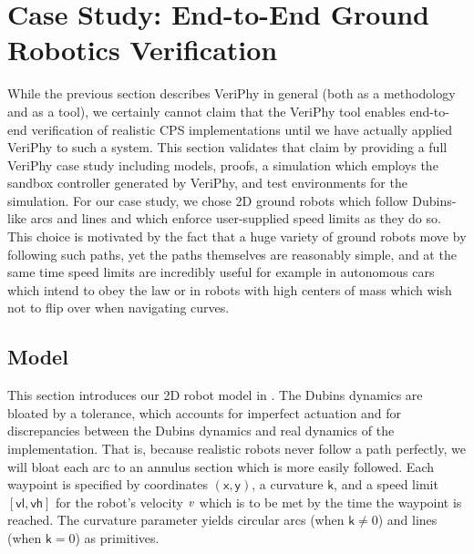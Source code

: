 \documentclass[12pt]{cmuthesis}
\theoremstyle{definition}
\theoremstyle{remark}
\newcommand{\xgvar}{\textsf{x}}
\newcommand{\ygvar}{\textsf{y}}
\newcommand{\kvar}{\textsf{k}}
\newcommand{\vlvar}{\textsf{vl}}
\newcommand{\vhvar}{\textsf{vh}}
\newcommand{\VeriPhy}{VeriPhy\xspace}
\begin{document}
\section{Case Study: End-to-End Ground Robotics Verification}
\label{sec:ground-robotics}

While the previous section describes \VeriPhy in general (both as a methodology and as a tool), we certainly cannot claim that the \VeriPhy tool enables end-to-end verification of realistic CPS implementations until we have actually applied \VeriPhy to such a system.
This section validates that claim by providing a full \VeriPhy case study including \dL models, proofs, a simulation which employs the sandbox controller generated by \VeriPhy, and test environments for the simulation.
For our case study, we chose 2D ground robots which follow Dubins-like arcs and lines and which enforce user-supplied speed limits as they do so.
This choice is motivated by the fact that a huge variety of ground robots move by following such paths, yet the paths themselves are reasonably simple, and at the same time speed limits are incredibly useful for example in autonomous cars which intend to obey the law or in robots with high centers of mass which wish not to flip over when navigating curves.

\subsection{Model}
\label{sec:planar-driving-system}
This section introduces our 2D robot model in \dL.
The Dubins dynamics are bloated by a tolerance, which accounts for imperfect actuation and for discrepancies between the Dubins dynamics and real dynamics of the implementation.
That is, because realistic robots never follow a path perfectly, we will bloat each arc to an annulus section which is more easily followed.
Each waypoint is specified by coordinates $(\xgvar,\ygvar)$, a curvature $\kvar$, and a speed limit $[\vlvar,\vhvar]$ for the robot's velocity ${\it v}$ which is to be met by the time the waypoint is reached.
The curvature parameter yields circular arcs (when $\kvar \not= 0$) and lines (when $\kvar=0$) as primitives.
\end{document}
